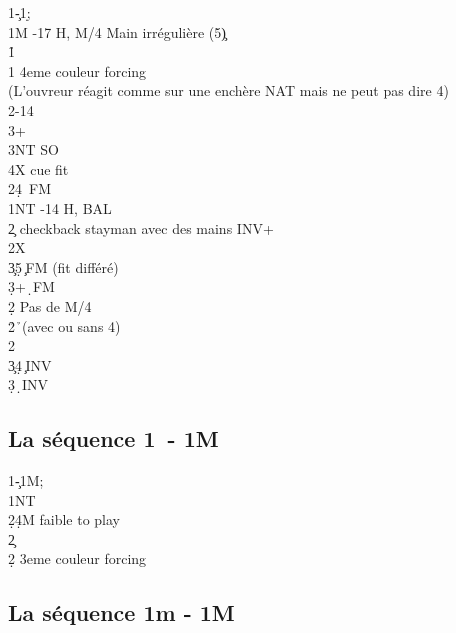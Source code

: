 \documentclass[a4paper]{article}
\begin{document}
\begin{bidtable}
1\c-1\d;\\
1M -17 H, M/4 Main irrégulière (5\c )\\
1\h\+\\
1\s \> 4eme couleur forcing\\
\>(L’ouvreur réagit comme sur une enchère NAT mais ne peut pas dire 4\s ) \+\\
2\s {}-14\\
3\s {}+\+\\
3NT \> SO\\
4X \> cue fit \s \-\-\\
2\s {}\d 4\s\ FM\-\\
1NT -14 H, BAL\+\\
2\c \> checkback stayman avec des mains INV+\+\\
2X\+\\
3\c {}\d 5\c\ FM (fit différé)\\
3\d {}+\d\ FM\-\\
2\d \> Pas de M/4\\
2\h {}\h\ (avec ou sans 4\s )\\
2\s {}\s \-\\
3\c {}\d 4\c\ INV\\
3\d {}\d\ INV\-
\end{bidtable}

\subsection{La séquence 1\pdfc\ - 1M}

\begin{bidtable}
1\c-1M;\\
1NT\+\\
2\d {}\d 4M faible to play\-\\
2\c\+\\
2\d \> 3eme couleur forcing\-
\end{bidtable}

\subsection{La séquence 1m - 1M}
\end{document}
